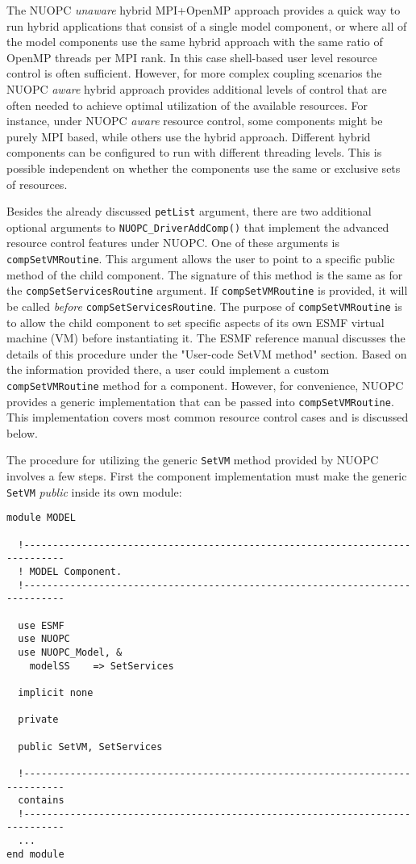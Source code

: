 The NUOPC {\em unaware} hybrid MPI+OpenMP approach provides a quick way to run hybrid applications that consist of a single model component, or where all of the model components use the same hybrid approach with the same ratio of OpenMP threads per MPI rank. In this case shell-based user level resource control is often sufficient. However, for more complex coupling scenarios the NUOPC {\em aware} hybrid approach provides additional levels of control that are often needed to achieve optimal utilization of the available resources. For instance, under NUOPC {\em aware} resource control, some components might be purely MPI based, while others use the hybrid approach. Different hybrid components can be configured to run with different threading levels. This is possible independent on whether the components use the same or exclusive sets of resources.

Besides the already discussed {\tt petList} argument, there are two additional optional arguments to {\tt NUOPC\_DriverAddComp()} that implement the advanced resource control features under NUOPC. One of these arguments is {\tt compSetVMRoutine}. This argument allows the user to point to a specific public method of the child component. The signature of this method is the same as for the {\tt compSetServicesRoutine} argument. If {\tt compSetVMRoutine} is provided, it will be called {\em before} {\tt compSetServicesRoutine}. The purpose of {\tt compSetVMRoutine} is to allow the child component to set specific aspects of its own ESMF virtual machine (VM) before instantiating it. The ESMF reference manual discusses the details of this procedure under the "User-code SetVM method" section. Based on the information provided there, a user could implement a custom {\tt compSetVMRoutine} method for a component. However, for convenience, NUOPC provides a generic implementation that can be passed into {\tt compSetVMRoutine}. This implementation covers most common resource control cases and is discussed below.

The procedure for utilizing the generic {\tt SetVM} method provided by NUOPC involves a few steps. First the component implementation must make the generic {\tt SetVM} {\em public} inside its own module:

\begin{verbatim}
module MODEL

  !-----------------------------------------------------------------------------
  ! MODEL Component.
  !-----------------------------------------------------------------------------

  use ESMF
  use NUOPC
  use NUOPC_Model, &
    modelSS    => SetServices

  implicit none

  private

  public SetVM, SetServices

  !-----------------------------------------------------------------------------
  contains
  !-----------------------------------------------------------------------------
  ...
end module
\end{verbatim}


